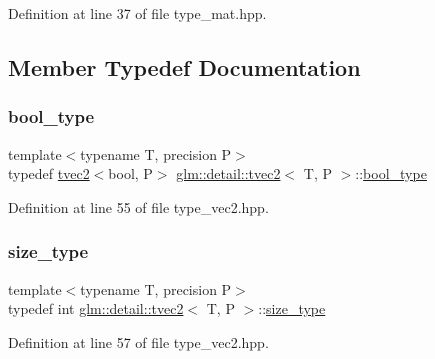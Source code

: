 Definition at line 37 of file type\+\_\+mat.\+hpp.



\subsection{Member Typedef Documentation}
\mbox{\label{structglm_1_1detail_1_1tvec2_af7537fd9a8c9dae6b92100b609eb2aaf}} 
\subsubsection{\texorpdfstring{bool\+\_\+type}{bool\_type}}
{\footnotesize\ttfamily template$<$typename T, precision P$>$ \\
typedef \hyperlink{structglm_1_1detail_1_1tvec2}{tvec2}$<$bool, P$>$ \hyperlink{structglm_1_1detail_1_1tvec2}{glm\+::detail\+::tvec2}$<$ T, P $>$\+::\hyperlink{structglm_1_1detail_1_1tvec2_af7537fd9a8c9dae6b92100b609eb2aaf}{bool\+\_\+type}}



Definition at line 55 of file type\+\_\+vec2.\+hpp.

\mbox{\label{structglm_1_1detail_1_1tvec2_a66667d9497ad5c7ff1b60bafa9fb9592}} 
\subsubsection{\texorpdfstring{size\+\_\+type}{size\_type}}
{\footnotesize\ttfamily template$<$typename T, precision P$>$ \\
typedef int \hyperlink{structglm_1_1detail_1_1tvec2}{glm\+::detail\+::tvec2}$<$ T, P $>$\+::\hyperlink{structglm_1_1detail_1_1tvec2_a66667d9497ad5c7ff1b60bafa9fb9592}{size\+\_\+type}}



Definition at line 57 of file type\+\_\+vec2.\+hpp.

\mbox{\label{structglm_1_1detail_1_1tvec2_a644c796a3f1da08b7481ca69fbd10818}} 
